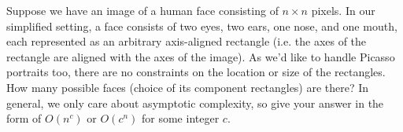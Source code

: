\item {}

Suppose we have an image of a human face consisting of $n \times n$ pixels. In
our simplified setting, a face consists of two eyes, two ears, one nose, and one
mouth, each represented as an arbitrary axis-aligned rectangle (i.e. the axes of
the rectangle are aligned with the axes of the image).  As we'd like to handle
Picasso portraits too, there are no constraints on the location or size of the
rectangles. How many possible faces (choice of its component rectangles) are
there? In general, we only care about asymptotic complexity, so give your answer
in the form of $O(n^c)$ or $O(c^n)$ for some integer $c$.

